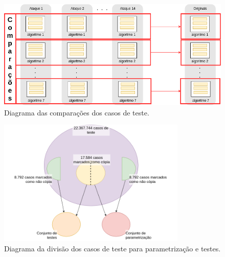 
\begin{figure}[h]
    \centering
    \caption{Diagrama das comparações dos casos de teste.}
    \label{fig:comparacao}
    \includegraphics[width=1.0\textwidth]{dados/figuras/Comparador-1}
\end{figure}

\begin{figure}[h]
    \centering
    \caption{Diagrama da divisão dos casos de teste para parametrização e testes.}
    \label{fig:casosteste}
  
    \includegraphics[width=0.8\textwidth]{dados/figuras/Casos}
    
    
\end{figure}




